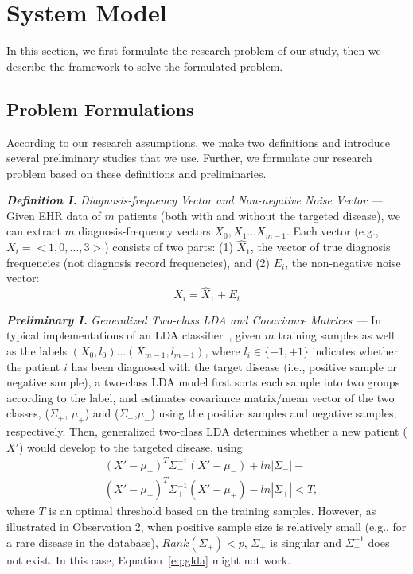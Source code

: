 \section{\TheName{} System Model}\label{sec:3}
In this section, we first formulate the research problem of our study, then we describe the \TheName{} framework to solve the formulated problem.

\subsection{Problem Formulations}
According to our research assumptions, we make two definitions and introduce several preliminary studies that we use. Further, we formulate our research problem based on these definitions and preliminaries.

\textbf{\em Definition I.} \emph{Diagnosis-frequency Vector and Non-negative Noise Vector --- } Given EHR data of $m$ patients (both with and without the targeted disease), we can extract $m$ diagnosis-frequency vectors $X_0,X_1\dots X_{m-1}$. Each vector (e.g., $X_i=<1,0,\dots,3>$) consists of two parts: (1) $\hat{X}_1$, the vector of true diagnosis frequencies (not diagnosis record frequencies), and (2) $E_i$, the non-negative noise vector:
\begin{equation}
X_i=\hat{X}_1+E_i
\end{equation}

\textbf{\em Preliminary I. } \emph{Generalized Two-class LDA and Covariance Matrices --- } 
In typical implementations of an LDA classifier~\cite{ziegel2003modern}, given $m$ training samples as well as the labels $(X_0,l_0)\dots (X_{m-1},l_{m-1})$, where $l_i\in\{-1,+1\}$ indicates whether the patient $i$ has been diagnosed with the target disease (i.e., positive sample or negative sample), a two-class LDA model first sorts each sample into two groups according to the label, and estimates covariance matrix/mean vector of the two classes, ($\Sigma_{+}$, $\mu_+$) and ($\Sigma_{-}$,$\mu_-$) using the positive samples and negative samples, respectively.  
Then, generalized two-class LDA determines whether a new patient ($X'$) would develop to the targeted disease, using
%
\begin{equation}
\begin{aligned}
&(X'-\mu_-)^T\Sigma_{-}^{-1}(X'-\mu_-)+ln|\Sigma_-|-\\
&(X'-\mu_+)^T\Sigma_{+}^{-1}(X'-\mu_+)-ln|\Sigma_+|<T,
\end{aligned}
\label{eq:glda}
\end{equation}
%
where $T$ is an optimal threshold based on the training samples. However, as illustrated in Observation 2,  when positive sample size is relatively small (e.g., for a rare disease in the database),  $Rank(\Sigma_+)<p$,  $\Sigma_{+}$ is singular and $\Sigma_{+}^{-1}$  does not exist. In this case, Equation~\ref{eq:glda} might not work.

